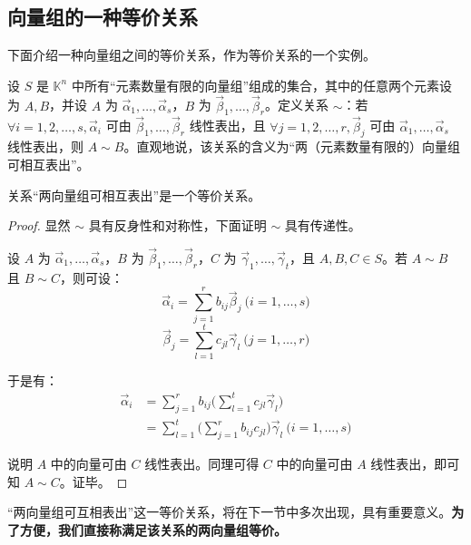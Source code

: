 \subsection{向量组的一种等价关系}

下面介绍一种向量组之间的等价关系，作为等价关系的一个实例。

设 $S$ 是 $\mathbb K^n$ 中所有“元素数量有限的向量组”组成的集合，其中的任意两个元素设为 $A, B$，并设 $A$ 为 $\vec \alpha_1, \ldots, \vec \alpha_s$，$B$ 为 $\vec \beta_1, \ldots, \vec \beta_r$。定义关系 $\sim$：若 $\forall i = 1, 2, \ldots, s, \vec \alpha_i$ 可由 $\vec \beta_1, \ldots, \vec \beta_r$ 线性表出，且 $\forall j = 1, 2, \ldots, r, \vec \beta_j$ 可由 $\vec \alpha_1, \ldots, \vec \alpha_s$ 线性表出，则 $A \sim B$。直观地说，该关系的含义为“两（元素数量有限的）向量组可相互表出”。

\begin{theorem}
	关系“两向量组可相互表出”是一个等价关系。
\end{theorem}

\begin{proof}
	显然 $\sim$ 具有反身性和对称性，下面证明 $\sim$ 具有传递性。

	设 $A$ 为 $\vec \alpha_1, \ldots, \vec \alpha_s$，$B$ 为 $\vec \beta_1, \ldots, \vec \beta_r$，$C$ 为 $\vec \gamma_1, \ldots, \vec \gamma_t$，且 $A, B, C \in S$。若 $A \sim B$ 且 $B \sim C$，则可设：
	$$
	\vec \alpha_i = \sum\limits_{j = 1}^r b_{ij} \vec \beta_j \pod{i = 1, \ldots, s}
	$$$$
	\vec \beta_j = \sum\limits_{l = 1}^t c_{jl} \vec \gamma_l \pod{j = 1, \ldots, r}
	$$

	于是有：
	$$
	\begin{aligned}
		\vec \alpha_i &= \sum\limits_{j = 1}^r b_{ij} \biggl( \sum\limits_{l = 1}^t c_{jl} \vec \gamma_l \biggr)
		\\&=
		\sum\limits_{l = 1}^t \biggl( \sum\limits_{j = 1}^r b_{ij} c_{jl} \biggr) \vec \gamma_l \pod{i = 1, \ldots, s}
	\end{aligned}
	$$

	说明 $A$ 中的向量可由 $C$ 线性表出。同理可得 $C$ 中的向量可由 $A$ 线性表出，即可知 $A \sim C$。证毕。
\end{proof}

“两向量组可互相表出”这一等价关系，将在下一节中多次出现，具有重要意义。\textbf{为了方便，我们直接称满足该关系的两向量组等价。}